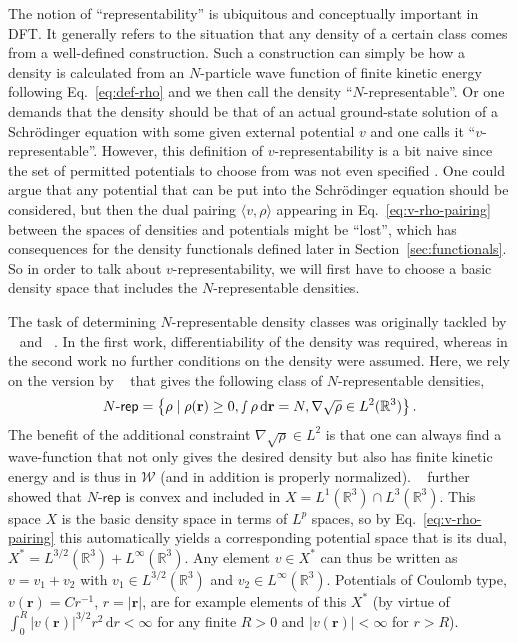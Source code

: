\documentclass[journal=apcach,manuscript=article,layout=twocolumn]{achemso}
\newcommand{\R}{\mathbb{R}}
\renewcommand{\d}{\,\mathrm{d}} %
\newcommand{\psispace}{\mathcal{W}}
\newcommand{\rr}{\mathbf{r}}
\newcommand{\Nrep}{\ensuremath{N\text{-}\mathsf{rep}}}
\begin{document}
The notion of ``representability'' is ubiquitous and conceptually important in DFT. 
It generally refers to the situation that any density of a certain class comes from a well-defined construction.
Such a construction can simply be how a density is calculated from an $N$-particle wave function of finite kinetic energy following Eq.~\eqref{eq:def-rho} and we then call the density ``$N$-representable''. Or one demands that the density should be that of an actual ground-state solution of a Schr\"odinger equation with some given external potential $v$ and one calls it ``$v$-representable''. However, this definition of $v$-representability is a bit naive since the set of permitted potentials to choose from was not even specified \cite{Lammert2007}. One could argue that any potential that can be put into the Schr\"odinger equation should be considered, but then the dual pairing $\langle v,\rho\rangle $ appearing in Eq.~\eqref{eq:v-rho-pairing} between the spaces of densities and potentials might be ``lost'', which has consequences for the density functionals defined later in Section~\ref{sec:functionals}. So in order to talk about $v$-representability, we will first have to choose a basic density space that includes the $N$-representable densities.

The task of determining $N$-representable density classes was originally tackled by \citeauthor{gilbert1975}~\cite{gilbert1975} and \citeauthor{harriman1981}~\cite{harriman1981}. In the first work, differentiability of the density was required, whereas in the second work no further conditions on the density were assumed.
Here, we rely on the version by \citeauthor{Lieb1983}~\cite[Theorem~1.2]{Lieb1983} that gives the following class of $N$-representable densities,
\begin{equation*}%
    \Nrep = \left\{ \rho \mid \rho(\rr)\geq 0, \smallint \rho \d \rr=N, \nabla \sqrt \rho \in L^2(\R^3) \right\}.
\end{equation*}
The benefit of the additional constraint $\nabla\sqrt \rho \in L^2$ is that one can always find a wave-function that not only gives the desired density but also has finite kinetic energy and is thus in $\psispace$ (and in addition is properly normalized). \citeauthor{Lieb1983}~\cite{Lieb1983} further showed that $\Nrep$ is convex and included in $X=L^1(\R^3)\cap L^3(\R^3)$. This space $X$ is the basic density space in terms of $L^p$ spaces, so by Eq.~\eqref{eq:v-rho-pairing} this automatically yields a corresponding potential space that is its dual, $X^*=L^{3/2}(\R^3)+L^\infty(\R^3)$. Any element $v\in X^*$ can thus be written as $v=v_1+v_2$ with $v_1\in L^{3/2}(\R^3)$ and $v_2\in L^\infty(\R^3)$. 
Potentials of Coulomb type, $v(\rr) = C r^{-1}$, $r =|\rr|$, are for example elements of this $X^*$ (by virtue of $\int_0^R |v(\rr)|^{3/2} r^2 \d r < \infty$ for any finite $R>0$ and $|v(\rr)|<\infty$ for $r>R$). 
\end{document}
